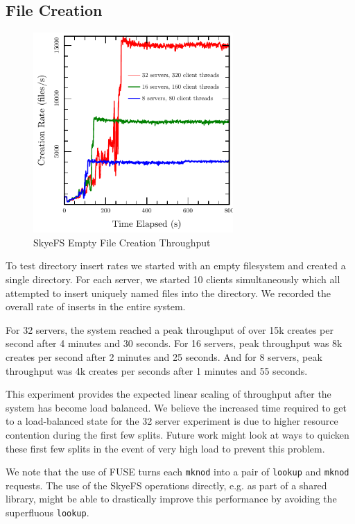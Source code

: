 \documentclass[twocolumn,letterpaper]{article}
\newcommand{\code}[1]{\texttt{#1}}
\begin{document}
\subsection{File Creation}
\begin{figure}
\begin{center}
\includegraphics[width=3in]{graph-create}
\end{center}
\caption{SkyeFS Empty File Creation Throughput}
\end{figure}

To test directory insert rates we started with an empty filesystem and created
a single directory.  For each server, we started 10 clients simultaneously
which all attempted to insert uniquely named files into the directory.  We
recorded the overall rate of inserts in the entire system.

For 32 servers, the system reached a peak throughput of over 15k creates per second
after 4 minutes and 30 seconds.  For 16 servers, peak throughput was 8k
creates per second after 2 minutes and 25 seconds.  And for 8 servers, peak
throughput was 4k creates per seconds after 1 minutes and 55 seconds.

This experiment provides the expected linear scaling of throughput after the
system has become load balanced.  We believe the increased time required to
get to a load-balanced state for the 32 server experiment is due to higher
resource contention during the first few splits.  Future work might look at
ways to quicken these first few splits in the event of very high load to
prevent this problem.

We note that the use of FUSE turns each \code{mknod} into a pair of
\code{lookup} and \code{mknod} requests.  The use of the SkyeFS operations
directly, e.g. as part of a shared library, might be able to drastically
improve this performance by avoiding the superfluous \code{lookup}.
\end{document}
